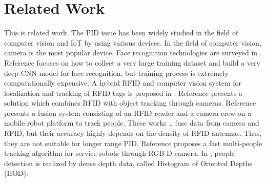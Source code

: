 \chapter{Related Work}
\label{ch:relatedwork}
This is related work. The PID issue has been widely studied in the field of computer vision and IoT by using various devices. In the field of computer vision, camera is the most popular device. Face recognition technologies are surveyed in \cite{zhao2003face}. Reference \cite{parkhi2015deep} focuses on how to collect a very large training dataset and build a very deep CNN model for face recognition, but training process is extremely computationally expensive. A hybrid RFID and computer vision system for localization and tracking of RFID tags is proposed in \cite{goller2014fusing}. Reference \cite{isasi2010location} presents a solution which combines RFID with object tracking through cameras. Reference \cite{germa2010vision} presents a fusion system consisting of an RFID reader and a camera crew on a mobile robot platform to track people. These works \cite{goller2014fusing},\cite{isasi2010location},\cite{germa2010vision} fuse data from camera and RFID, but their accuracy highly depends on the density of RFID antennas. Thus, they are not suitable for longer range PID. Reference \cite{munaro2014fast} proposes a fast multi-people tracking algorithm for service robots through RGB-D camera. In \cite{spinello2011people}, people detection is realized by dense depth data, called Histogram of Oriented Depths (HOD). 